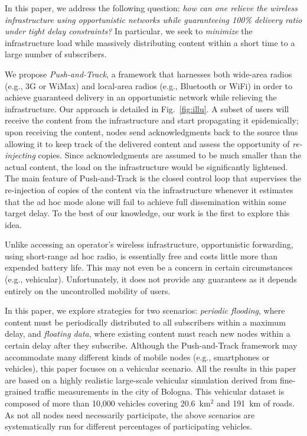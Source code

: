\documentclass[preprint]{elsarticle}
\begin{document}
In this paper, we address the following question: \textit{how can one relieve the wireless infrastructure using opportunistic networks while guaranteeing 100\% delivery ratio under tight delay constraints?} In particular, we seek to \textit{minimize} the infrastructure load while massively distributing content within a short time to a large number of subscribers. 

We propose \textit{Push-and-Track}, a framework that harnesses both wide-area radios (e.g., 3G or WiMax) and local-area radios (e.g., Bluetooth or WiFi) in order to achieve guaranteed delivery in an opportunistic network while relieving the infrastructure. Our approach is detailed in Fig.~\ref{fig:illu}. A subset of users will receive the content from the infrastructure and start propagating it epidemically; upon receiving the content, nodes send acknowledgments back to the source thus allowing it to keep track of the delivered content and assess the opportunity of \textit{re-injecting} copies. Since acknowledgments are assumed to be much smaller than the actual content, the load on the infrastructure would be significantly lightened. The main feature of Push-and-Track is the closed control loop that supervises the re-injection of copies of the content via the infrastructure whenever it estimates that the ad hoc mode alone will fail to achieve full dissemination within some target delay. To the best of our knowledge, our work is the first to explore this idea.

Unlike accessing an operator's wireless infrastructure, opportunistic forwarding, using short-range ad hoc radio, is essentially free and costs little more than expended battery life. This may not even be a concern in certain circumstances (e.g., vehicular). Unfortunately, it does not provide any guarantees as it depends entirely on the uncontrolled mobility of users.

In this paper, we explore strategies for two scenarios: \textit{periodic flooding}, where content must be periodically distributed to all subscribers within a maximum delay, and \textit{floating data}, where existing content must reach new nodes within a certain delay after they subscribe. Although the Push-and-Track framework may accommodate many different kinds of mobile nodes (e.g., smartphones or vehicles), this paper focuses on a vehicular scenario. All the results in this paper are based on a highly realistic large-scale vehicular simulation derived from fine-grained traffic measurements in the city of Bologna. This vehicular dataset is composed of more than 10,000 vehicles covering 20.6~km$^{2}$ and 191~km of roads. As not all nodes need necessarily participate, the above scenarios are systematically run for different percentages of participating vehicles.
\end{document}
